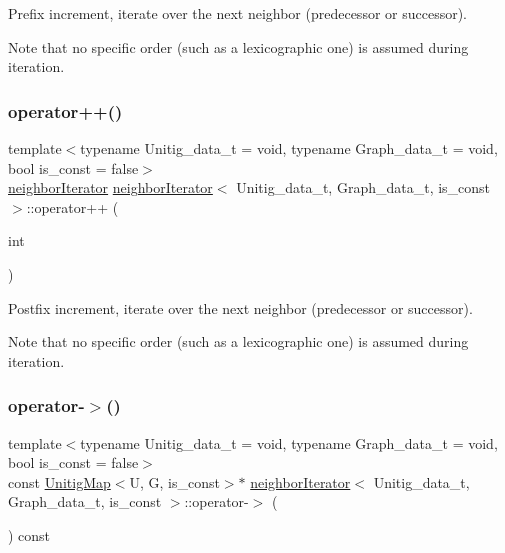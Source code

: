 Prefix increment, iterate over the next neighbor (predecessor or successor). 

Note that no specific order (such as a lexicographic one) is assumed during iteration. \mbox{\label{classneighborIterator_a508d1dccf8281fed8abd8aaefb145570}} 
\subsubsection{\texorpdfstring{operator++()}{operator++()}\hspace{0.1cm}{\footnotesize\ttfamily [2/2]}}
{\footnotesize\ttfamily template$<$typename Unitig\+\_\+data\+\_\+t = void, typename Graph\+\_\+data\+\_\+t = void, bool is\+\_\+const = false$>$ \\
\hyperlink{classneighborIterator}{neighbor\+Iterator} \hyperlink{classneighborIterator}{neighbor\+Iterator}$<$ Unitig\+\_\+data\+\_\+t, Graph\+\_\+data\+\_\+t, is\+\_\+const $>$\+::operator++ (\begin{DoxyParamCaption}\item[{int}]{ }\end{DoxyParamCaption})}



Postfix increment, iterate over the next neighbor (predecessor or successor). 

Note that no specific order (such as a lexicographic one) is assumed during iteration. \mbox{\label{classneighborIterator_a9626c1843dc3134a53756c7c0c3309da}} 
\subsubsection{\texorpdfstring{operator-\/$>$()}{operator->()}}
{\footnotesize\ttfamily template$<$typename Unitig\+\_\+data\+\_\+t = void, typename Graph\+\_\+data\+\_\+t = void, bool is\+\_\+const = false$>$ \\
const \hyperlink{classUnitigMap}{Unitig\+Map}$<$U, G, is\+\_\+const$>$$\ast$ \hyperlink{classneighborIterator}{neighbor\+Iterator}$<$ Unitig\+\_\+data\+\_\+t, Graph\+\_\+data\+\_\+t, is\+\_\+const $>$\+::operator-\/$>$ (\begin{DoxyParamCaption}{ }\end{DoxyParamCaption}) const}



